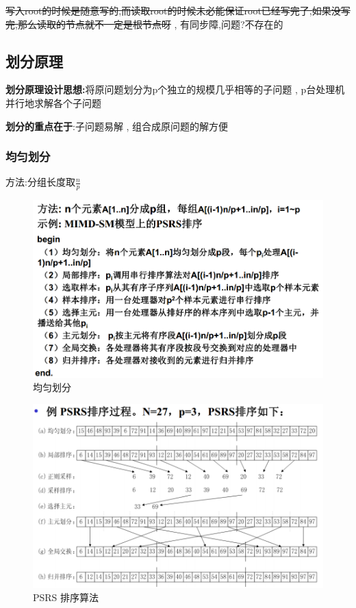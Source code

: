 \documentclass[UTF8,a4paper]{ctexart}
\begin{document}
  {\sout{写入root的时候是随意写的,而读取root的时候未必能保证root已经写完了,如果没写完,那么读取的节点就不一定是根节点呀} , 有同步障,问题?不存在的}

  \subsection{划分原理}
  \textbf{划分原理设计思想:}将原问题划分为p个独立的规模几乎相等的子问题 , p台处理机并行地求解各个子问题

  \textbf{划分的重点在于}:子问题易解 , 组合成原问题的解方便

  \subsubsection{均匀划分}
  方法:分组长度取$\frac{n}{p}$
  \begin{figure}[H]
    \centering
    \includegraphics[scale = 0.3]{assets/ParallelComputing_c0fc1.png}
    \caption{均匀划分}
  \end{figure}

  \begin{figure}[H]
    \centering
    \includegraphics[scale = 0.3]{assets/ParallelComputing_7763b.png}
    \caption{PSRS 排序算法}
  \end{figure}
\end{document}
